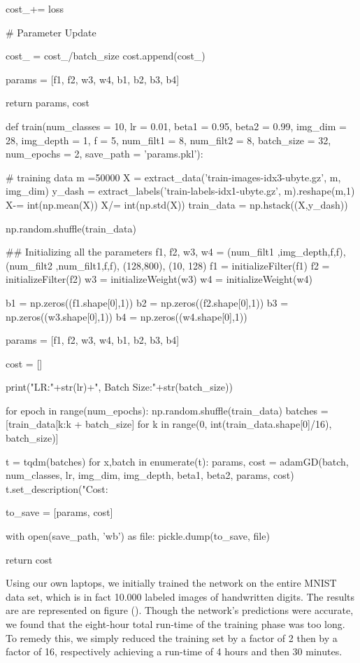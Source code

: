         cost_+= loss

    # Parameter Update  

    

    cost_ = cost_/batch_size
    cost.append(cost_)

    params = [f1, f2, w3, w4, b1, b2, b3, b4]
    
    return params, cost
\stoptyping

\starttyping
def train(num_classes = 10, lr = 0.01, beta1 = 0.95, beta2 = 0.99, img_dim = 28, img_depth = 1, f = 5, num_filt1 = 8, num_filt2 = 8, batch_size = 32, num_epochs = 2, save_path = 'params.pkl'):

    # training data
    m =50000
    X = extract_data('train-images-idx3-ubyte.gz', m, img_dim)
    y_dash = extract_labels('train-labels-idx1-ubyte.gz', m).reshape(m,1)
    X-= int(np.mean(X))
    X/= int(np.std(X))
    train_data = np.hstack((X,y_dash))
    
    np.random.shuffle(train_data)

    ## Initializing all the parameters
    f1, f2, w3, w4 = (num_filt1 ,img_depth,f,f), (num_filt2 ,num_filt1,f,f), (128,800), (10, 128)
    f1 = initializeFilter(f1)
    f2 = initializeFilter(f2)
    w3 = initializeWeight(w3)
    w4 = initializeWeight(w4)

    b1 = np.zeros((f1.shape[0],1))
    b2 = np.zeros((f2.shape[0],1))
    b3 = np.zeros((w3.shape[0],1))
    b4 = np.zeros((w4.shape[0],1))

    params = [f1, f2, w3, w4, b1, b2, b3, b4]

    cost = []

    print("LR:"+str(lr)+", Batch Size:"+str(batch_size))

    for epoch in range(num_epochs):
        np.random.shuffle(train_data)
        batches = [train_data[k:k + batch_size] for k in range(0, int(train_data.shape[0]/16), batch_size)]

        t = tqdm(batches)
        for x,batch in enumerate(t):
            params, cost = adamGD(batch, num_classes, lr, img_dim, img_depth, beta1, beta2, params, cost)
            t.set_description("Cost: %
            
    to_save = [params, cost]
    
    with open(save_path, 'wb') as file:
        pickle.dump(to_save, file)
        
    return cost
\stoptyping
\stopsubsection


\startsubsection[title=Results]
Using our own laptops, we initially trained the network on the entire MNIST data set, which is in fact 10.000 labeled images of handwritten digits.
The results are are represented on figure ().
Though the network's predictions were accurate, we found that the eight-hour total run-time of the training phase  was too long.
To remedy this, we simply reduced the training set by a factor of 2 then by a factor of 16, respectively achieving a run-time of 4 hours and then 30 minutes.
\stopsubsection
\stopsection
